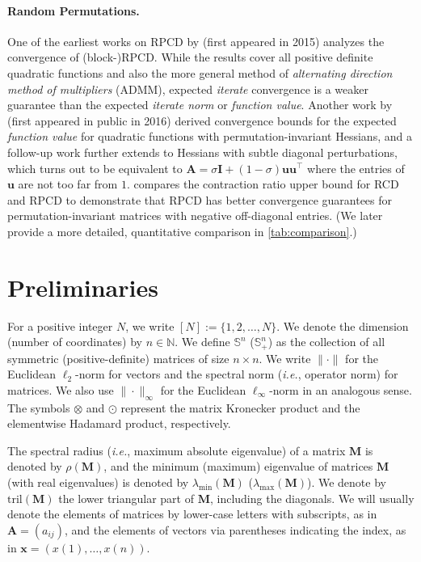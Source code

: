 \documentclass{article}
\theoremstyle{plain}
\theoremstyle{definition}
\theoremstyle{remark}
\newcommand{\tril}{\mathrm{tril}}
\def\vu{{\bm{u}}}
\def\vx{{\bm{x}}}
\def\mA{{\bm{A}}}
\def\mI{{\bm{I}}}
\def\mM{{\bm{M}}}
\def\sN{{\mathbb{N}}}
\def\sS{{\mathbb{S}}}
\begin{document}
\paragraph{Random Permutations.}
One of the earliest works on RPCD by \citet{sun20} (first appeared in 2015) analyzes the convergence of (block-)RPCD.
While the results cover all positive definite quadratic functions and also the more general method of \emph{alternating direction method of multipliers} (ADMM), expected \emph{iterate} convergence is a weaker guarantee than the expected \emph{iterate norm} or \emph{function value}.
Another work by \citet{lee2019} (first appeared in public in 2016) derived convergence bounds for the expected \emph{function value} for quadratic functions with permutation-invariant Hessians, and a follow-up work \citet{wright17} further extends to Hessians with subtle diagonal perturbations, which turns out to be equivalent to $\mA = \sigma \mI + (1- \sigma) \vu \vu^{\top}$ where the entries of $\vu$ are not too far from $1$.
\citet{gurbuzbalaban18} compares the contraction ratio upper bound for RCD and RPCD to demonstrate that RPCD has better convergence guarantees for permutation-invariant matrices with negative off-diagonal entries.
(We later provide a more detailed, quantitative comparison in \cref{tab:comparison}.)



\section{Preliminaries}
\label{sec:2}
For a positive integer $N$, we write $[N] := \{ 1, 2, \dots, N \}$. 
We denote the dimension (number of coordinates) by $n \in \sN$.
We define $\sS^{n}$ ($\sS_{+}^{n}$) as the collection of all symmetric (positive-definite) matrices of size $n \times n$.
We write $\|\cdot\|$ for the Euclidean $\ell_2$-norm for vectors and the spectral norm ({\it i.e.},  operator norm) for matrices.
We also use $\|\cdot\|_{\infty}$ for the Euclidean $\ell_{\infty}$-norm in an analogous sense.
The symbols $\otimes$ and $\odot$ represent the matrix Kronecker product and the elementwise Hadamard product, respectively.

The spectral radius ({\it i.e.}, maximum absolute eigenvalue) of a matrix $\mM$ is denoted by $\rho(\mM)$, and the minimum (maximum) eigenvalue of matrices $\mM$ (with real eigenvalues) is denoted by $\lambda_{\min} (\mM)$ ($\lambda_{\max} (\mM)$). 
We denote by $\tril(\mM)$ the lower triangular part of $\mM$, including the diagonals.
We will usually denote the elements of matrices by lower-case letters with subscripts, as in $\mA = (a_{ij})$, and the elements of vectors via parentheses indicating the index, as in $\vx = (x(1), \dots, x(n))$.
\end{document}
